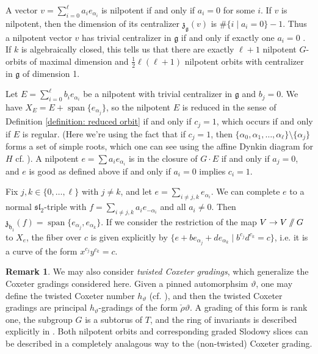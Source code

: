 \documentclass{article} %
\numberwithin{equation}{section}
\theoremstyle{definition}
\newtheorem{remark}[proposition]{Remark}
\newcommand{\GIT}{\mathbin{/\mkern-6mu/}}
\newcommand{\frakg}{\mathfrak g}
\newcommand{\frakh}{\mathfrak h}
\newcommand{\frakz}{\mathfrak z}
\newcommand{\fraksl}{\mathfrak{sl}}
\newcommand{\al}{\alpha}
\DeclareMathOperator{\spn}{span}
\begin{document}
A vector $v = \sum_{i = 0}^\ell a_ie_{\al_i}$ is nilpotent if and only if $a_i = 0$ for some $i$. 
If $v$ is nilpotent, then the dimension of its centralizer $\frakz_{\frakg}(v)$ is $\# \{i \mid a_i = 0\} - 1$. 
Thus a nilpotent vector $v$ has trivial centralizer in $\frakg$ if and only if exactly one $a_i = 0$ . If $k$ is algebraically closed, this tells us that there are exactly $\ell + 1$ nilpotent $G$-orbits of maximal dimension and $\frac{1}{2}\ell(\ell + 1)$ nilpotent orbits with centralizer in $\frakg$ of dimension 1. 

Let $E = \sum_{i = 0}^\ell b_ie_{\al_i}$ be a nilpotent with trivial centralizer in $\frakg$ and $b_j = 0$. We have $X_E = E + \spn\{e_{\al_j}\}$, so the nilpotent $E$ is reduced in the sense of Definition \ref{definition: reduced orbit} if and only if $c_j = 1$, which occurs if and only if $E$ is regular. (Here we're using the fact that if $c_j = 1$, then $\{\al_0, \al_1, \dots, \al_\ell\}\setminus \{\al_j\}$ forms a set of simple roots, which one can see using the affine Dynkin diagram for $H$ cf. \cite[Section 1.8]{Iwahori-Matsumoto}). 
A nilpotent $e = \sum a_ie_{\al_i}$ is in the closure of $G\cdot E$ if and only if $a_j = 0$, and $e$ is good as defined above if and only if $a_i = 0$ implies $c_i = 1$. 




Fix $j, k \in \{0, \dots, \ell\}$ with $j \neq k$, and let $e = \sum_{i \neq j, k} e_{\al_i}$. 
We can complete $e$ to a normal $\fraksl_2$-triple with $f = \sum_{i \neq j, k} a_ie_{-\al_i}$ and all $a_i \neq 0$. Then $\frakz_{\frakh_1}(f) = \spn\{e_{\al_j}, e_{\al_k}\}$. If we consider the restriction of the map $V \to V\GIT G$ to $X_e$, the fiber over $c$ is given explicitly by $\{e + be_{\al_j} + de_{\al_k} \mid b^{c_j}d^{c_k} = c\}$, i.e. it is a curve of the form $x^{c_j}y^{c_k} = c$. 


\begin{remark}
We may also consider \textit{twisted Coxeter gradings}, which generalize the Coxeter gradings considered here. Given a pinned automorphsim $\vartheta$, one may define the twisted Coxeter number $h_{\vartheta}$ (cf. \cite[Section 5]{Reeder-torsion}), and then the twisted Coxeter gradings are principal $h_{\vartheta}$-gradings of the form $\check\rho\vartheta$. A grading of this form is rank one, the subgroup $G$ is a subtorus of $T$, and the ring of invariants is described explicitly in \cite[Section 4.2]{VilonenXue}. 
Both nilpotent orbits and corresponding graded Slodowy slices can be described in a completely analagous way to the (non-twisted) Coxeter grading.
\end{remark}
\end{document}
